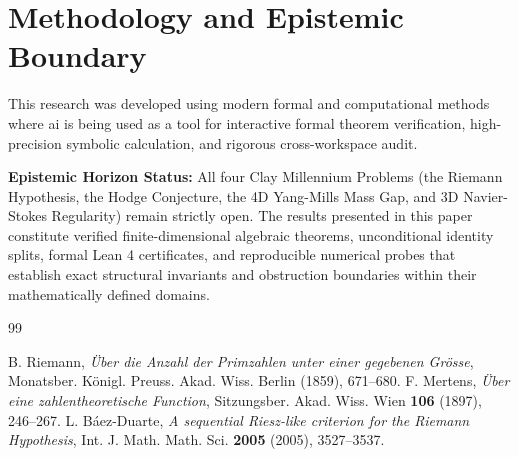 \documentclass[11pt,a4paper]{article}
\theoremstyle{definition}
\begin{document}
\section{Methodology and Epistemic Boundary}
\noindent This research was developed using modern formal and computational methods where ai is being used as a tool for interactive formal theorem verification, high-precision symbolic calculation, and rigorous cross-workspace audit.

\vspace{0.5em}
\noindent\textbf{Epistemic Horizon Status:} All four Clay Millennium Problems (the Riemann Hypothesis, the Hodge Conjecture, the 4D Yang-Mills Mass Gap, and 3D Navier-Stokes Regularity) remain strictly open. The results presented in this paper constitute verified finite-dimensional algebraic theorems, unconditional identity splits, formal Lean 4 certificates, and reproducible numerical probes that establish exact structural invariants and obstruction boundaries within their mathematically defined domains.

\begin{thebibliography}{99}

 B. Riemann, \emph{\"Uber die Anzahl der Primzahlen unter einer gegebenen Gr\"osse}, Monatsber. K\"onigl. Preuss. Akad. Wiss. Berlin (1859), 671--680.
 F. Mertens, \emph{\"Uber eine zahlentheoretische Function}, Sitzungsber. Akad. Wiss. Wien \textbf{106} (1897), 246--267.
 L. B\'aez-Duarte, \emph{A sequential Riesz-like criterion for the Riemann Hypothesis}, Int. J. Math. Math. Sci. \textbf{2005} (2005), 3527--3537.

\end{thebibliography}
\end{document}
